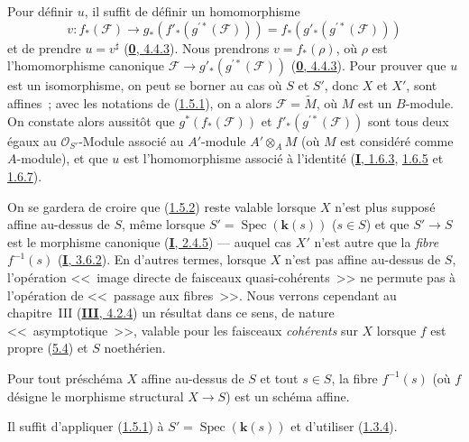 Pour définir $u$, il suffit de définir un homomorphisme
\[
  v:f_*(\mathcal{F})\longrightarrow
  g_*(f'_*(g^{\prime*}(\mathcal{F})))
  =f_*(g'_*(g^{\prime*}(\mathcal{F})))
\]
et de prendre $u=v^\sharp$ (\hyperref[0.4.4.3-fr]{\textbf{0}, 4.4.3}). Nous prendrons
$v=f_*(\rho)$, où $\rho$ est l'homomorphisme canonique
$\mathcal{F}\to g'_*(g^{\prime*}(\mathcal{F}))$
(\hyperref[0.4.4.3-fr]{\textbf{0}, 4.4.3}). Pour prouver que $u$ est un isomorphisme,
on peut se borner au cas où $S$ et $S'$, donc $X$ et $X'$, sont affines~;
avec les notations de (\hyperref[II.1.5.1-fr]{1.5.1}), on a alors
$\mathcal{F}=\widetilde{M}$, où $M$ est un $B$-module. On constate alors
aussitôt que $g^*(f_*(\mathcal{F}))$ et
$f'_*(g^{\prime*}(\mathcal{F}))$ sont tous deux égaux au
$\mathcal{O}_{S'}$-Module associé au $A'$-module $A'\otimes_A M$ (où $M$ est
considéré comme $A$-module), et que $u$ est l'homomorphisme associé à
l'identité (\hyperref[I.1.6.3-fr]{\textbf{I}, 1.6.3},
\hyperref[I.1.6.5-fr]{1.6.5} et \hyperref[I.1.6.7-fr]{1.6.7}).

\begin{remark}[1.5.3]
\label{II.1.5.3-fr}
On se gardera de croire que (\hyperref[II.1.5.2-fr]{1.5.2}) reste valable
lorsque $X$ n'est plus supposé affine au-dessus de $S$, même lorsque
$S'=\operatorname{Spec}(\boldsymbol{k}(s))$ ($s\in S$) et que $S'\to S$ est le morphisme
canonique (\hyperref[I.2.4.5-fr]{\textbf{I}, 2.4.5}) --- auquel cas $X'$ n'est autre
que la \emph{fibre} $f^{-1}(s)$ (\hyperref[I.3.6.2-fr]{\textbf{I}, 3.6.2}). En
d'autres termes, lorsque $X$ n'est pas affine au-dessus de $S$, l'opération
<<~image directe de faisceaux quasi-cohérents~>> ne permute pas à l'opération
de <<~passage aux fibres~>>. Nous verrons cependant au chapitre~III
(\hyperref[III.4.2.4-fr]{\textbf{III}, 4.2.4}) un résultat dans ce sens, de nature
<<~asymptotique~>>, valable pour les faisceaux \emph{cohérents} sur $X$ lorsque
$f$ est propre (\hyperref[II.5.4-fr]{5.4}) et $S$ noethérien.
\end{remark}

\begin{corollary}[1.5.4]
\label{II.1.5.4-fr}
Pour tout préschéma $X$ affine au-dessus de $S$ et tout $s\in S$, la fibre
$f^{-1}(s)$ (où $f$ désigne le morphisme structural $X\to S$) est un schéma
affine.
\end{corollary}

Il suffit d'appliquer (\hyperref[II.1.5.1-fr]{1.5.1}) à
$S'=\operatorname{Spec}(\boldsymbol{k}(s))$ et d'utiliser
(\hyperref[II.1.3.4-fr]{1.3.4}).

